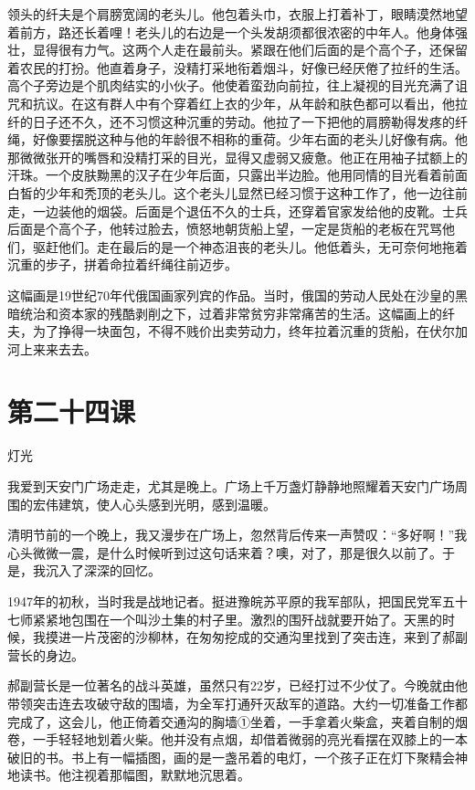 \documentclass[12pt,UTF8]{ctexbook}
\begin{document}
领头的纤夫是个肩膀宽阔的老头儿。他包着头巾，衣服上打着补丁，眼睛漠然地望着前方，路还长着哩！老头儿的右边是一个头发胡须都很浓密的中年人。他身体强壮，显得很有力气。这两个人走在最前头。紧跟在他们后面的是个高个子，还保留着农民的打扮。他直着身子，没精打采地衔着烟斗，好像已经厌倦了拉纤的生活。高个子旁边是个肌肉结实的小伙子。他使着蛮劲向前拉，往上凝视的目光充满了诅咒和抗议。在这有群人中有个穿着红上衣的少年，从年龄和肤色都可以看出，他拉纤的日子还不久，还不习惯这种沉重的劳动。他拉了一下把他的肩膀勒得发疼的纤绳，好像要摆脱这种与他的年龄很不相称的重荷。少年右面的老头儿好像有病。他那微微张开的嘴唇和没精打采的目光，显得又虚弱又疲惫。他正在用袖子拭额上的汗珠。一个皮肤黝黑的汉子在少年后面，只露出半边脸。他用同情的目光看着前面白皙的少年和秃顶的老头儿。这个老头儿显然已经习惯于这种工作了，他一边往前走，一边装他的烟袋。后面是个退伍不久的士兵，还穿着官家发给他的皮靴。士兵后面是个高个子，他转过脸去，愤怒地朝货船上望，一定是货船的老板在咒骂他们，驱赶他们。走在最后的是一个神态沮丧的老头儿。他低着头，无可奈何地拖着沉重的步子，拼着命拉着纤绳往前迈步。

这幅画是19世纪70年代俄国画家列宾的作品。当时，俄国的劳动人民处在沙皇的黑暗统治和资本家的残酷剥削之下，过着非常贫穷非常痛苦的生活。这幅画上的纤夫，为了挣得一块面包，不得不贱价出卖劳动力，终年拉着沉重的货船，在伏尔加河上来来去去。

\section{第二十四课}

灯光

我爱到天安门广场走走，尤其是晚上。广场上千万盏灯静静地照耀着天安门广场周围的宏伟建筑，使人心头感到光明，感到温暖。

清明节前的一个晚上，我又漫步在广场上，忽然背后传来一声赞叹：“多好啊！”我心头微微一震，是什么时候听到过这句话来着？噢，对了，那是很久以前了。于是，我沉入了深深的回忆。

1947年的初秋，当时我是战地记者。挺进豫皖苏平原的我军部队，把国民党军五十七师紧紧地包围在一个叫沙土集的村子里。激烈的围歼战就要开始了。天黑的时候，我摸进一片茂密的沙柳林，在匆匆挖成的交通沟里找到了突击连，来到了郝副营长的身边。

郝副营长是一位著名的战斗英雄，虽然只有22岁，已经打过不少仗了。今晚就由他带领突击连去攻破守敌的围墙，为全军打通歼灭敌军的道路。大约一切准备工作都完成了，这会儿，他正倚着交通沟的胸墙①坐着，一手拿着火柴盒，夹着自制的烟卷，一手轻轻地划着火柴。他并没有点烟，却借着微弱的亮光看摆在双膝上的一本破旧的书。书上有一幅插图，画的是一盏吊着的电灯，一个孩子正在灯下聚精会神地读书。他注视着那幅图，默默地沉思着。
\end{document}
